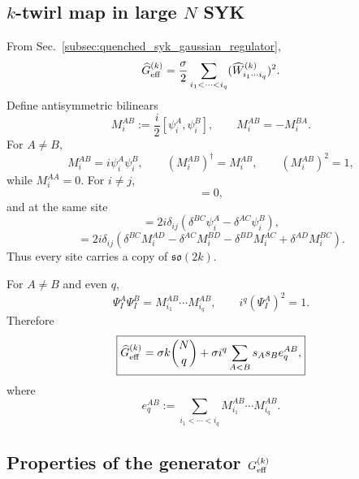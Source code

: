\documentclass{article}
\theoremstyle{definition}
\begin{document}
\subsection{$k$-twirl map in large $N$ SYK}

From Sec.~\ref{subsec:quenched_syk_gaussian_regulator},
\begin{equation}
    \widehat G_{\rm eff}^{(k)}
    =\frac{\sigma}{2}
    \sum_{i_1<\cdots<i_q}
    (\widehat W_{i_1\cdots i_q}^{(k)})^2.
\end{equation}
Define antisymmetric bilinears
\begin{equation}
    M_i^{AB}:=\frac{i}{2}[\psi_i^A,\psi_i^B],
    \qquad
    M_i^{AB}=-M_i^{BA}.
\end{equation}
For $A\neq B$,
\begin{equation}
    M_i^{AB}=i\psi_i^A\psi_i^B,
    \qquad
    (M_i^{AB})^\dagger=M_i^{AB},
    \qquad
    (M_i^{AB})^2=1,
\end{equation}
while $M_i^{AA}=0$.  For $i\neq j$,
\begin{equation}
    [M_i^{AB},M_j^{CD}]=0,
\end{equation}
and at the same site
\begin{equation}
    [M_i^{AB},\psi_j^C]
    =2i\delta_{ij}
    (\delta^{BC}\psi_i^A-\delta^{AC}\psi_i^B),
\end{equation}
\begin{equation}
    [M_i^{AB},M_j^{CD}]
    =2i\delta_{ij}
    (\delta^{BC}M_i^{AD}-\delta^{AC}M_i^{BD}
     -\delta^{BD}M_i^{AC}+\delta^{AD}M_i^{BC}).
\end{equation}
Thus every site carries a copy of $\mathfrak{so}(2k)$.

For $A\neq B$ and even $q$,
\begin{equation}
    \Psi_I^A\Psi_I^B
    =M_{i_1}^{AB}\cdots M_{i_q}^{AB},
    \qquad
    i^q(\Psi_I^A)^2=1.
\end{equation}
Therefore
\begin{equation}
    \boxed{
    \widehat G_{\rm eff}^{(k)}
    =\sigma k\binom Nq
     +\sigma i^q\sum_{A<B}s_As_B e_q^{AB},
    }
\end{equation}
where
\begin{equation}
    e_q^{AB}
    :=\sum_{i_1<\cdots<i_q}
    M_{i_1}^{AB}\cdots M_{i_q}^{AB}.
\end{equation}

\subsection{Properties of the generator $G_{\rm eff}^{(k)}$}
\end{document}
